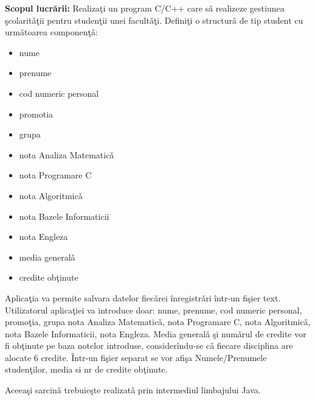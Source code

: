 \textbf{Scopul lucr\u{a}rii:} Realiza\c{t}i un program C/C++ care s\v{a} realizeze
gestiunea \c{s}colarit\v{a}\c{t}ii pentru studen\c{t}ii unei facult\v{a}\c{t}i.
Defini\c{t}i o structur\v{a} de tip student cu urm\v{a}toarea componen\c{t}\v{a}:
\begin{itemize}
    \setlength\itemsep{0em}
    \item nume
    \item prenume
    \item cod numeric personal
    \item promotia
    \item grupa
    \item nota Analiza Matematic\v{a}
    \item nota Programare C
    \item nota Algoritmic\v{a}
    \item nota Bazele Informaticii
    \item nota Engleza
    \item media general\v{a}
    \item credite ob\c{t}inute
\end{itemize}
Aplica\c{t}ia va permite salvara datelor fiec\v{a}rei \^{i}nregistr\v{a}ri \^{i}ntr-un fi\c{s}ier text.
Utilizatorul aplica\c{t}iei va introduce doar: nume, prenume, cod numeric personal, promo\c{t}ia, grupa
nota Analiza Matematic\v{a}, nota Programare C, nota Algoritmic\v{a}, nota Bazele Informaticii, nota 
Engleza. Media general\v{a} \c{s}i num\v{a}rul de credite vor fi ob\c{t}inute pe baza notelor introduse,
consider\^{i}ndu-se c\v{a} fiecare disciplina are alocate 6 credite. \^{I}ntr-un fi\c{s}ier separat se
vor afi\c{s}a Numele/Prenumele studen\c{t}ilor, media si nr de credite ob\c{t}inute.

Aceea\c{s}i sarcin\v{a} trebuie\c{s}te realizat\v{a} prin intermediul limbajului Java.
